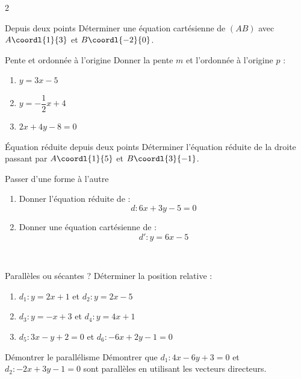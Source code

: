 \begin{multicols}{2}
	\begin{exo}{Depuis deux points}
		Déterminer une équation cartésienne de $(AB)$ avec
		$A\coordl{1}{3}$ et $B\coordl{-2}{0}$.
	\end{exo}


	\begin{exo}{Pente et ordonnée à l'origine}
		Donner la pente $m$ et l'ordonnée à l'origine $p$ :
		\begin{enumerate}[leftmargin=*]
			\item $y = 3x - 5$
			\item $y = -\dfrac{1}{2}x + 4$
			\item $2x + 4y - 8 = 0$
		\end{enumerate}
	\end{exo}

	\begin{exo}{Équation réduite depuis deux points}
		Déterminer l'équation réduite de la droite passant par
		$A\coordl{1}{5}$ et $B\coordl{3}{-1}$.
	\end{exo}
	\begin{exo}{Passer d'une forme à l'autre}
		\begin{enumerate}[leftmargin=*]
			\item Donner l'équation réduite de :
			      \[ d : 6x + 3y - 5 = 0 \]
			\item Donner une équation cartésienne de :
			      \[ d' : y = 6x - 5 \]
		\end{enumerate}
	\end{exo}

	\vfill~\columnbreak


	\begin{exo}{Parallèles ou sécantes ?}
		Déterminer la position relative :
		\begin{enumerate}[leftmargin=*]
			\item $d_1 : y = 2x + 1$ et $d_2 : y = 2x - 5$
			\item $d_3 : y = -x + 3$ et $d_4 : y = 4x + 1$
			\item $d_5 : 3x - y + 2 = 0$ et $d_6 : -6x + 2y - 1 = 0$
		\end{enumerate}
	\end{exo}

	\begin{exo}{Démontrer le parallélisme}
		Démontrer que $d_1 : 4x - 6y + 3 = 0$ et $d_2 : -2x + 3y - 1 = 0$
		sont parallèles en utilisant les vecteurs directeurs.
	\end{exo}


\end{multicols}
